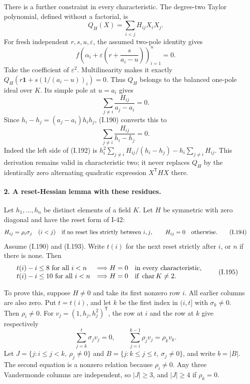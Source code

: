 There is a further constraint in every characteristic.
The degree-two Taylor polynomial, defined without a
factorial, is
\[
 Q_H(X)=\sum_{i<j}H_{ij}X_iX_j.
 \tag{I.191}
\]
For fresh independent $r,s,u,\varepsilon$, the assumed
two-pole identity gives
\[
 f\!\left(\alpha_i+
       \varepsilon\left(r+\frac{s}{a_i-u}\right)\right)_{i=1}^n=0.
\]
Take the coefficient of $\varepsilon^2$. Multilinearity
makes it exactly
$Q_H(r\mathbf1+s(1/(a_i-u))_i)=0$. Thus $Q_H$ belongs
to the balanced one-pole ideal over $K$. Its simple pole
at $u=a_i$ gives
\[
 \sum_{j\ne i}\frac{H_{ij}}{a_j-a_i}=0.
 \tag{I.192}
\]
Since $h_i-h_j=(a_j-a_i)h_ih_j$, (I.190) converts this to
\[
 \sum_{j\ne i}\frac{H_{ij}}{h_i-h_j}=0.
 \tag{I.193}
\]
Indeed the left side of (I.192) is
$h_i^2\sum_{j\ne i}H_{ij}/(h_i-h_j)-h_i\sum_{j\ne i}H_{ij}$.
This derivation remains valid in characteristic two; it
never replaces $Q_H$ by the identically zero alternating
quadratic expression $X^{\mathsf T}HX$ there.

\paragraph{2. A reset-Hessian lemma with these residues.}
Let $h_1,\ldots,h_n$ be distinct elements of a field $K$.
Let $H$ be symmetric with zero diagonal and have the reset
form of I-42:
\[
 H_{ij}=\rho_i\sigma_j\quad(i<j)
 \quad\hbox{if no reset lies strictly between $i,j$},
 \qquad H_{ij}=0\quad\hbox{otherwise}.
 \tag{I.194}
\]
Assume (I.190) and (I.193). Write $t(i)$ for the next
reset strictly after $i$, or $n$ if there is none.
Then
\[
 \begin{array}{ll}
 t(i)-i\le8\ \hbox{for all }i<n&\Longrightarrow H=0
                       \quad\hbox{in every characteristic},\\
 t(i)-i\le10\ \hbox{for all }i<n&\Longrightarrow H=0
                       \quad\hbox{if }\operatorname{char}K\ne2.
 \end{array}
 \tag{I.195}
\]

To prove this, suppose $H\ne0$ and take its first nonzero
row $i$. All earlier columns are also zero. Put $t=t(i)$,
and let $k$ be the first index in $(i,t]$ with
$\sigma_k\ne0$. Then $\rho_i\ne0$. For
$v_j=(1,h_j,h_j^2)^{\mathsf T}$, the row at $i$ and the
row at $k$ give respectively
\[
 \sum_{j=k}^t\sigma_jv_j=0,
 \qquad
 \sum_{j=i}^{k-1}\rho_jv_j=\rho_kv_k.
 \tag{I.196}
\]
Let $J=\{j:i\le j<k,\ \rho_j\ne0\}$ and
$B=\{j:k\le j\le t,\ \sigma_j\ne0\}$, and write
$b=|B|$. The second equation is a nonzero relation because
$\rho_i\ne0$. Any three Vandermonde columns are independent,
so $|J|\ge3$, and $|J|\ge4$ if $\rho_k=0$.

